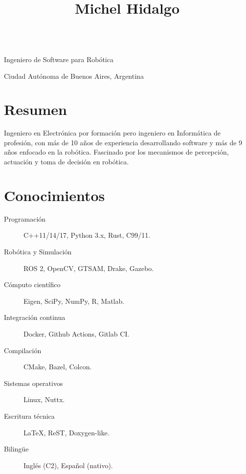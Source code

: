 \documentclass[spanish, letterpaper]{resume}
\begin{document}
\begin{center}
  \title{Michel Hidalgo} \\
  Ingeniero de Software para Robótica \\
  \address{Buenos Aires}{
    Ciudad Autónoma de Buenos Aires,
    Argentina} \\
  \begin{inlined}
    \item {}
    \item {}
    \item {}
  \end{inlined}
\end{center}

\section*{Resumen}

Ingeniero en Electrónica por formación pero ingeniero en Informática de profesión, con más de 10 años de experiencia desarrollando software y más de 9 años enfocado en la robótica. Fascinado por los mecanismos de percepción, actuación y toma de decisión en robótica.

\section*{Conocimientos}

\hfill
\begin{minipage}{0.55\linewidth}
  \begin{description}
    \item[Programación] C++11/14/17, Python 3.x, Rust, C99/11.
    \item[Robótica y Simulación] ROS 2, OpenCV, GTSAM, Drake, Gazebo.
    \item[Cómputo científico] Eigen, SciPy, NumPy, R, Matlab.
    \item[Integración continua] Docker, Github Actions, Gitlab CI.
  \end{description}
\end{minipage}\hfill
\begin{minipage}{0.4\linewidth}
  \begin{description}
    \item[Compilación] CMake, Bazel, Colcon.
    \item[Sistemas operativos] Linux, Nuttx.
    \item[Escritura técnica] La\TeX, ReST, Doxygen-like.
    \item[Bilingüe] Inglés (C2), Español (nativo).
  \end{description}
\end{minipage}
\hfill
\end{document}
